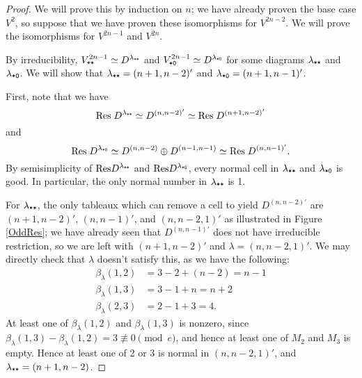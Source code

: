 \documentclass{amsart}
\begin{document}
\begin{proof}
  We will prove this by induction on $n$;
  we have already proven the base case $V^{2}$, so suppose that we have proven these isomorphisms for $V^{2n-2}$.
  We will prove the isomorphisms for $V^{2n-1}$ and $V^{2n}$.

  By irreducibility, $V^{2n-1}_{\texttt{*}\texttt{*}} \simeq D^{\lambda_{\texttt{*}\texttt{*}}}$ and $V^{2n-1}_{\texttt{*}\texttt{0}} \simeq D^{\lambda_{\texttt{*}\texttt{0}}}$ for some diagrams $\lambda_{\texttt{*}\texttt{*}}$ and $\lambda_{\texttt{*}\texttt{0}}$.
  We will show that $\lambda_{\texttt{*}\texttt{*}} = (n+1,n-2)'$ and $\lambda_{\texttt{*}\texttt{0}} = (n+1,n-1)'$.
  
  First, note that we have \[\text{Res} \; D^{\lambda_{\texttt{*}\texttt{*}}} \simeq D^{(n,n-2)'} \simeq \text{Res} \; D^{(n+1,n-2)'}\] and \[\text{Res} \; D^{\lambda_{\texttt{*}\texttt{0}}} \simeq D^{(n,n-2)} \oplus D^{(n-1,n-1)} \simeq \text{Res} \; D^{(n,n-1)'}.\]
  By semisimplicity of $\text{Res} D^{\lambda_{\texttt{*}\texttt{*}}}$ and $\text{Res} D^{\lambda_{\texttt{*}\texttt{0}}}$, every normal cell in $\lambda_{\texttt{*}\texttt{*}}$ and $\lambda_{\texttt{*}\texttt{0}}$ is good.
  In particular, the only normal number in $\lambda_{\texttt{*}\texttt{*}}$ is 1.

  For $\lambda_{\texttt{*}\texttt{*}}$, the only tableaux which can remove a cell to yield $D^{(n,n-2)'}$ are $(n+1,n-2)'$, $(n,n-1)'$, and $(n,n-2,1)'$ as illustrated in Figure \ref{OddRes};
  we have already seen that $D^{(n,n-1)'}$ does not have irreducible restriction, so we are left with $(n+1,n-2)'$ and $\lambda = (n,n-2,1)'$.
  We may directly check that $\lambda$ doesn't satisfy this, as we have the following:
  \begin{align*} 
    \beta_\lambda(1,2) &= 3 - 2 + (n-2) = n-1\\
    \beta_\lambda(1,3) &= 3 - 1 + n = n+2\\
    \beta_\lambda(2,3) &= 2 - 1 + 3 = 4.
   \end{align*} 
  At least one of $\beta_\lambda(1,2)$ and $\beta_\lambda(1,3)$ is nonzero, since $\beta_\lambda(1,3) - \beta_\lambda(1,2) = 3 \not\equiv 0 \pmod e$, and hence at least one of $M_2$ and $M_3$ is empty.
  Hence at least one of 2 or 3 is normal in $(n,n-2,1)'$, and $\lambda_{\texttt{*}\texttt{*}} = (n+1,n-2)$.


\end{proof}
\end{document}
